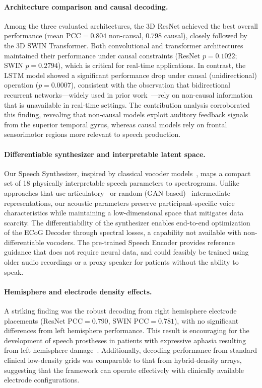 \documentclass[11pt]{article}
\begin{document}
\paragraph{Architecture comparison and causal decoding.} Among the three evaluated architectures, the 3D ResNet achieved the best overall performance (mean PCC${}=0.804$ non-causal, $0.798$ causal), closely followed by the 3D SWIN Transformer. Both convolutional and transformer architectures maintained their performance under causal constraints (ResNet $p=0.1022$; SWIN $p=0.2794$), which is critical for real-time applications. In contrast, the LSTM model showed a significant performance drop under causal (unidirectional) operation ($p=0.0007$), consistent with the observation that bidirectional recurrent networks---widely used in prior work~\citep{anumanchipalli2019speech, makin2020machine}---rely on non-causal information that is unavailable in real-time settings. The contribution analysis corroborated this finding, revealing that non-causal models exploit auditory feedback signals from the superior temporal gyrus, whereas causal models rely on frontal sensorimotor regions more relevant to speech production.

\paragraph{Differentiable synthesizer and interpretable latent space.} Our Speech Synthesizer, inspired by classical vocoder models~\citep{engel2020ddsp}, maps a compact set of 18 physically interpretable speech parameters to spectrograms. Unlike approaches that use articulatory~\citep{anumanchipalli2019speech} or random (GAN-based)~\citep{akbari2019towards} intermediate representations, our acoustic parameters preserve participant-specific voice characteristics while maintaining a low-dimensional space that mitigates data scarcity. The differentiability of the synthesizer enables end-to-end optimization of the ECoG Decoder through spectral losses, a capability not available with non-differentiable vocoders. The pre-trained Speech Encoder provides reference guidance that does not require neural data, and could feasibly be trained using older audio recordings or a proxy speaker for patients without the ability to speak.

\paragraph{Hemisphere and electrode density effects.} A striking finding was the robust decoding from right hemisphere electrode placements (ResNet PCC${}=0.790$, SWIN PCC${}=0.781$), with no significant differences from left hemisphere performance. This result is encouraging for the development of speech prostheses in patients with expressive aphasia resulting from left hemisphere damage~\citep{moses2021neuroprosthesis}. Additionally, decoding performance from standard clinical low-density grids was comparable to that from hybrid-density arrays, suggesting that the framework can operate effectively with clinically available electrode configurations.
\end{document}
